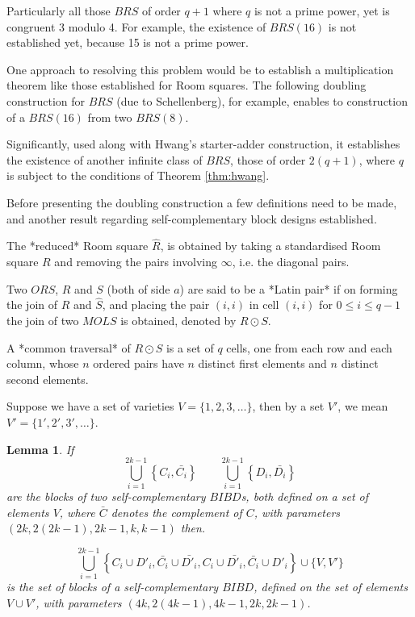 \documentclass[11pt, a4paper]{book}\usepackage[]{graphicx}\usepackage[]{xcolor}
\newcounter{example}
\newtheorem{lemma}[theorem]{Lemma}
\begin{document}
Particularly all those $BRS$ of order $q + 1$ where $q$ is not a
prime power, yet is congruent 3 modulo 4. For example, the
existence of $BRS(16)$ is not established yet, because 15 is
not a prime power.

One approach to resolving this problem
would be to establish a multiplication theorem like those
established for Room squares. The following doubling
construction for $BRS$ (due to Schellenberg), for example,
enables to construction of a $BRS(16)$ from two $BRS(8)$.

Significantly, used along with Hwang’s starter-adder
construction, it establishes the existence of another
infinite class of $BRS$, those of order $2(q + 1)$, where $q$
is subject to the conditions of Theorem \ref{thm:hwang}.

Before presenting the doubling construction a few
definitions need to be made, and another result regarding
self-complementary block designs established.

The *reduced* Room square $\hat{R}$, is obtained by taking a
standardised Room square $R$ and removing the pairs
involving $\infty$, i.e. the diagonal pairs.

Two $ORS$, $R$ and $S$ (both of side $a$) are said to be a
*Latin pair* if on forming the join of $\hat{R}$ and
$\hat{S}$, and placing the pair $(i, i)$ in cell $(i, i)$ for
$0 \leq i \leq q - 1$ the join of two $MOLS$ is obtained,
denoted by $R \odot S$.

A *common traversal* of $R \odot S$ is a set of $q$ cells,
one from each row and each column, whose $n$ ordered pairs
have $n$ distinct first elements and $n$ distinct second
elements.

Suppose we have a set of varieties $V = \{1, 2, 3, \ldots\}$, then
by a set $V'$, we mean $V'=\{1', 2', 3', \ldots\}$.

\begin{lemma}
If
\begin{equation}
  \bigcup\limits_{i=1}^{2k-1} \left \{C_i,\bar{C_i} \right \} 
  \qquad \bigcup\limits_{i=1}^{2k-1} \left \{D_i,\bar{D_i} \right \}
\end{equation}
are the blocks of two self-complementary $BIBD$s, both
defined on a set of elements $V$, where $\bar{C}$ denotes
the complement of $C$, with parameters
$(2k, 2(2k - 1), 2k - 1, k, k-1)$ then.

\begin{equation}
\bigcup\limits_{i=1}^{2k-1} \left \{C_i \cup D'_i, \bar{C_i} \cup \bar{D'_i}, C_i \cup \bar{D'_i}, \bar{C_i} \cup D'_i  \right \} \cup \{V,V'\}
\end{equation}
is the set of blocks of a self-complementary $BIBD$, defined
on the set of elements $V \cup V'$, with parameters
$(4k, 2(4k - 1), 4k - 1, 2k, 2k - 1)$.
\end{lemma}
\end{document}
